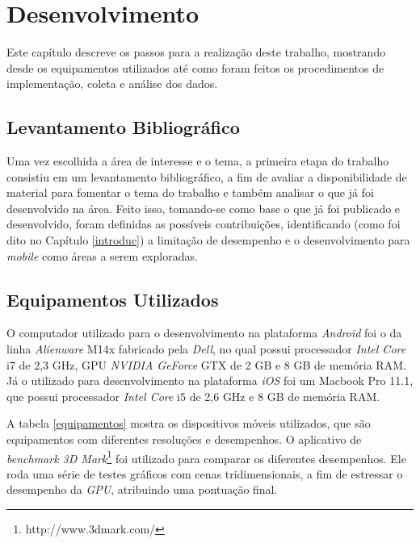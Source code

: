 \chapter[Desenvolvimento]{Desenvolvimento}

	Este capítulo descreve os passos para a realização deste trabalho, mostrando desde os equipamentos utilizados até como foram feitos os procedimentos de implementação, coleta e análise dos dados. 

\section{Levantamento Bibliográfico}

Uma vez escolhida a área de interesse e o tema, a primeira etapa do trabalho consistiu em um levantamento bibliográfico, a fim de avaliar a disponibilidade de material para fomentar o tema do trabalho e também analisar o que já foi desenvolvido na área. Feito isso, tomando-se como base o que já foi publicado e desenvolvido, foram definidas as possíveis contribuições, identificando (como foi dito no Capítulo \ref{introduc}) a limitação de desempenho e o desenvolvimento para \textit{mobile} como áreas a serem exploradas.  

\section{Equipamentos Utilizados}
\label{equip}

	 O computador utilizado para o desenvolvimento na plataforma \textit{Android} foi o da linha \textit{Alienware} M14x fabricado pela \textit{Dell}, no qual possui processador \textit{Intel Core} i7 de 2,3 GHz, GPU \textit{NVIDIA GeForce} GTX de 2 GB e 8 GB de memória RAM.  Já o utilizado para desenvolvimento na plataforma \textit{iOS} foi um Macbook Pro 11.1, que possui processador \textit{Intel Core} i5 de 2,6 GHz e 8 GB de memória RAM.

	A tabela \ref{equipamentos} mostra os dispositivos móveis utilizados, que são equipamentos com diferentes resoluções e desempenhos. O aplicativo de \textit{benchmark 3D Mark}\footnote{http://www.3dmark.com/} foi utilizado para comparar os diferentes desempenhos. Ele roda uma série de testes gráficos com cenas tridimensionais, a fim de estressar o desempenho da \textit{GPU}, atribuindo uma pontuação final.
	
